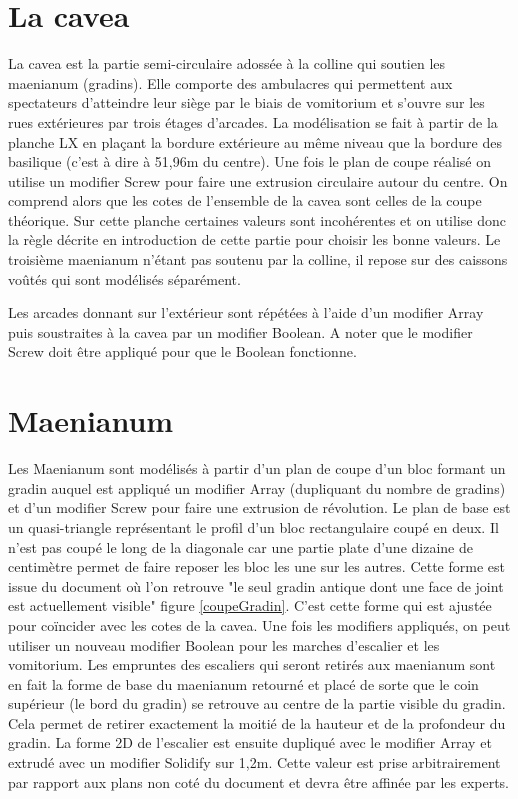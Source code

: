 		\section{La cavea} 

La cavea est la partie semi-circulaire adossée à la colline qui soutien les maenianum (gradins). Elle comporte des ambulacres qui permettent aux spectateurs d'atteindre leur siège par le biais de vomitorium et s'ouvre sur les rues extérieures par trois étages d'arcades. La modélisation se fait à partir de la planche LX \cite{ref2} en plaçant la bordure extérieure au même niveau que la bordure des basilique (c'est à dire à 51,96m du centre). Une fois le plan de coupe réalisé on utilise un modifier Screw pour faire une extrusion circulaire autour du centre. On comprend alors que les cotes de l'ensemble de la cavea sont celles de la coupe théorique. Sur cette planche certaines valeurs sont incohérentes et on utilise donc la règle décrite en introduction de cette partie pour choisir les bonne valeurs.
Le troisième maenianum n'étant pas soutenu par la colline, il repose sur des caissons voûtés qui sont modélisés séparément. 

Les arcades donnant sur l'extérieur sont répétées à l'aide d'un modifier Array puis soustraites à la cavea par un modifier Boolean. A noter que le modifier Screw doit être appliqué pour que le Boolean fonctionne.

		\section{Maenianum} 

Les Maenianum sont modélisés à partir d'un plan de coupe d'un bloc formant un gradin auquel est appliqué un modifier Array (dupliquant du nombre de gradins) et d'un modifier Screw pour faire une extrusion de révolution. Le plan de base est un quasi-triangle représentant le profil d'un bloc rectangulaire coupé en deux. Il n'est pas coupé le long de la diagonale car une partie plate d'une dizaine de centimètre permet de faire reposer les bloc les une sur les autres. Cette forme est issue du document \cite{ref} où l'on retrouve "le seul gradin antique dont une face de joint est actuellement visible" figure \ref{coupeGradin}. C'est cette forme qui est ajustée pour coïncider avec les cotes de la cavea. Une fois les modifiers appliqués, on peut utiliser un nouveau modifier Boolean pour les marches d'escalier et les vomitorium. Les empruntes des escaliers qui seront retirés aux maenianum sont en fait la forme de base du maenianum retourné et placé de sorte que le coin supérieur (le bord du gradin) se retrouve au centre de la partie visible du gradin. Cela permet de retirer exactement la moitié de la hauteur et de la profondeur du gradin. La forme 2D de l'escalier est ensuite dupliqué avec le modifier Array et extrudé avec un modifier Solidify sur 1,2m. Cette valeur est prise arbitrairement par rapport aux plans non coté du document \cite{ref2} et devra être affinée par les experts.

